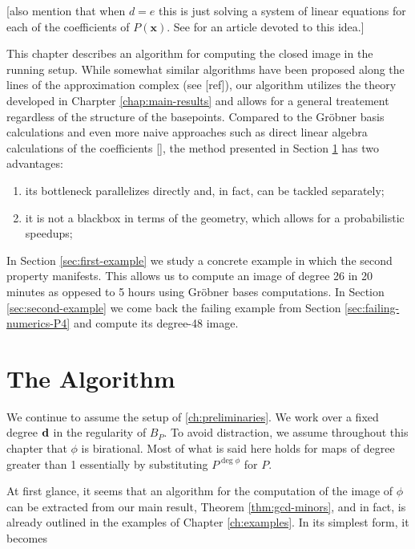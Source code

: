\documentclass[fleqn,reqno]{amsart}
\newcounter{chapter}
\numberwithin{first}{chapter}
\begin{document}

[also mention that when $d=e$ this is just solving a system of linear equations for each of the coefficients
of $P(\mathbf x)$. See \citet{Wang2004} for an article devoted to this idea.]

\begin{paragraf*}
This chapter describes an algorithm for computing the closed image in the running setup.
While somewhat similar algorithms have been proposed along the lines of
the approximation complex (see [ref]),
our algorithm utilizes the theory developed in Charpter \ref{chap:main-results}
and allows for a general treatement regardless of the structure of the basepoints.
Compared to the Gr\"obner basis calculations and even more naive approaches
such as direct linear algebra calculations of the coefficients [],
the method presented in Section \ref{sec:algorithm} has two advantages:
\begin{enumerate}
\item
its bottleneck parallelizes directly and, in fact, can be tackled separately;
\item
it is not a blackbox in terms of the geometry, which allows for a probabilistic speedups;
\end{enumerate}

In Section \ref{sec:first-example} we study a concrete example in which the second
property manifests.
This allows us to compute an image of degree 26 in 20 minutes as oppesed to 5 hours
using Gr\"obner bases computations.
In Section \ref{sec:second-example} we come back the failing example from
Section \ref{sec:failing-numerics-P4} and compute its degree-48 image.
\end{paragraf*}

\section{The Algorithm}
\label{sec:algorithm}

\begin{paragraf}
We continue to assume the setup of \ref{ch:preliminaries}.
We work over a fixed degree $\mathbf d$ in the regularity of $B_P$.
To avoid distraction, we assume throughout this chapter that $\phi$ is birational.
Most of what is said here holds for maps of degree greater than 1 essentially by
substituting $P^{\deg\phi}$ for $P$.
\end{paragraf}

\begin{paragraf}
At first glance, it seems that an algorithm for the computation of the image of $\phi$ can be
extracted from our main result, Theorem \ref{thm:gcd-minors}, and in fact,
is already outlined in the examples of Chapter \ref{ch:examples}.
In its simplest form, it becomes
\end{paragraf}
\end{document}
